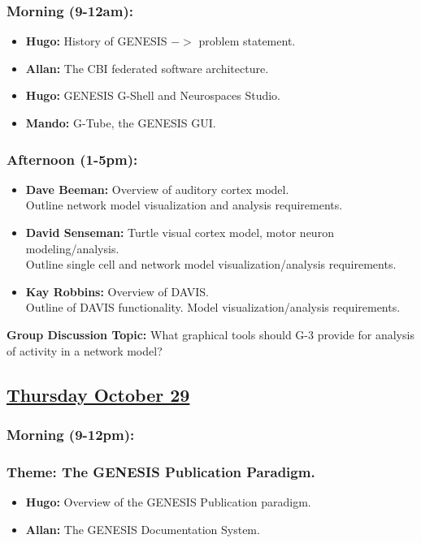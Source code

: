 \documentclass[12pt]{article}
\begin{document}
\subsubsection*{Morning (9-12am):}
\begin{itemize}
   \item[]{\bf Hugo:} History of GENESIS $->$ problem statement.
   \item[]{\bf Allan:} The CBI federated software architecture.
   \item[]{\bf Hugo:} GENESIS G-Shell and Neurospaces Studio.
   \item[]{\bf Mando:} G-Tube, the GENESIS GUI.
\end{itemize}

\subsubsection*{Afternoon (1-5pm):}
\begin{itemize}
   \item[]{\bf Dave Beeman:} Overview of auditory cortex model. \\
      Outline network model visualization and analysis requirements.
   \item[]{\bf David Senseman:} Turtle visual cortex model, motor neuron modeling/analysis. \\
      Outline single cell and network model visualization/analysis requirements.
  \item[]{\bf Kay Robbins:} Overview of DAVIS. \\
      Outline of DAVIS functionality. Model visualization/analysis requirements.
\end{itemize}
{\bf Group Discussion Topic:} What graphical tools should G-3 provide for analysis of activity in a network model?

\subsection*{\underline{Thursday October 29}}
\subsubsection*{\bf Morning (9-12pm):}
\subsubsection*{\bf Theme: The GENESIS Publication Paradigm.}

\begin{itemize}
   \item[]{\bf Hugo:} Overview of the GENESIS Publication paradigm.
   \item[]{\bf Allan:} The GENESIS Documentation System.
\end{itemize}
\end{document}
